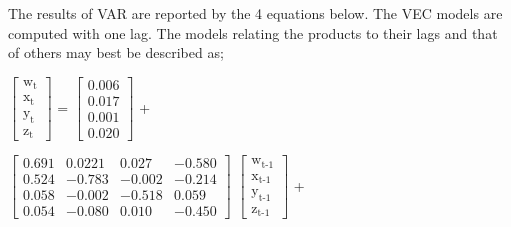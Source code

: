 \documentclass{beamer}
\newcommand{\vspaceFive}{\vspace{5pt}}
\newcommand{\varGasoline}{w}
\newcommand{\varGasoil}{x}
\newcommand{\varKerosene}{y}
\newcommand{\varLpg}{z}
\newcommand{\subTT}[2]{\text{#1}_{\text{#2}}}
\begin{document}
	\begin{frame}
		\begin{block}{}
			The results of VAR are reported by the 4 equations below. The VEC models are computed with one lag. The models relating the products to their lags and that of others may best be described as;
		\end{block} \vspaceFive
		
			\begin{math}
				\begin{bmatrix}
					\subTT{\varGasoline}{t} \\
					\subTT{\varGasoil}{t} \\
					\subTT{\varKerosene}{t} \\
					\subTT{\varLpg}{t}
				\end{bmatrix}
			\end{math}
			=
			\begin{math}
				\begin{bmatrix}
					0.006 \\
					0.017 \\
					0.001 \\
					0.020
				\end{bmatrix}
			\end{math}
			+
			
			\begin{math}
				\begin{bmatrix}
					0.691 & 0.0221 & 0.027 & -0.580 \\
					0.524 & -0.783 & -0.002 & -0.214 \\
					0.058 & -0.002 & -0.518 & 0.059 \\
					0.054 & -0.080 & 0.010 & -0.450
				\end{bmatrix}
			\end{math}
			\begin{math}
				\begin{bmatrix}
					\subTT{\varGasoline}{t-1} \\
					\subTT{\varGasoil}{t-1} \\
					\subTT{\varKerosene}{t-1} \\
					\subTT{\varLpg}{t-1}
				\end{bmatrix}
			\end{math}
			+
			

\end{frame}
\end{document}
